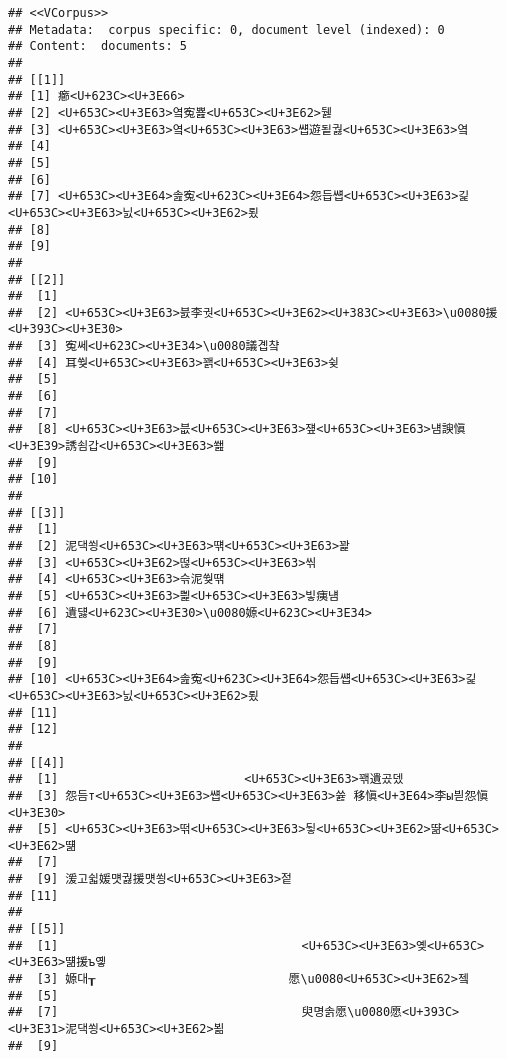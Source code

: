 \documentclass[]{article}
\begin{document}
\begin{verbatim}
## <<VCorpus>>
## Metadata:  corpus specific: 0, document level (indexed): 0
## Content:  documents: 5
## 
## [[1]]
## [1] 癤<U+623C><U+3E66>                  
## [2] <U+653C><U+3E63>옄寃뾾<U+653C><U+3E62>뒗
## [3] <U+653C><U+3E63>옄<U+653C><U+3E63>썝遊됱궗<U+653C><U+3E63>옄
## [4]                                     
## [5]                                     
## [6]                                     
## [7] <U+653C><U+3E64>솚寃<U+623C><U+3E64>怨듭썝<U+653C><U+3E63>긽<U+653C><U+3E63>닔<U+653C><U+3E62>룄
## [8]                                     
## [9]                                     
## 
## [[2]]
##  [1]                                     
##  [2] <U+653C><U+3E63>븘李궛<U+653C><U+3E62><U+383C><U+3E63>\u0080援<U+393C><U+3E30>
##  [3] 寃쎄<U+623C><U+3E34>\u0080議곕챸    
##  [4] 耳쒖<U+653C><U+3E63>꽭<U+653C><U+3E63>슂
##  [5]                                     
##  [6]                                     
##  [7]                                     
##  [8] <U+653C><U+3E63>븞<U+653C><U+3E63>쟾<U+653C><U+3E63>냼諛愼<U+3E39>誘쇰갑<U+653C><U+3E63>쐞
##  [9]                                     
## [10]                                     
## 
## [[3]]
##  [1]                                     
##  [2] 泥댁쑁<U+653C><U+3E63>떆<U+653C><U+3E63>꽕
##  [3] <U+653C><U+3E62>떦<U+653C><U+3E63>씪
##  [4] <U+653C><U+3E63>슦泥쒖떆            
##  [5] <U+653C><U+3E63>삁<U+653C><U+3E63>빟痍냼
##  [6] 遺덇<U+623C><U+3E30>\u0080嫄<U+623C><U+3E34>
##  [7]                                     
##  [8]                                     
##  [9]                                     
## [10] <U+653C><U+3E64>솚寃<U+623C><U+3E64>怨듭썝<U+653C><U+3E63>긽<U+653C><U+3E63>닔<U+653C><U+3E62>룄
## [11]                                     
## [12]                                     
## 
## [[4]]
##  [1]                          <U+653C><U+3E63>꽦遺곴뎄
##  [3] 怨듬т<U+653C><U+3E63>썝<U+653C><U+3E63>쓣 移愼<U+3E64>李ы븯怨愼<U+3E30>
##  [5] <U+653C><U+3E63>떢<U+653C><U+3E63>뒿<U+653C><U+3E62>땲<U+653C><U+3E62>떎                         
##  [7]                                                  
##  [9] 湲고쉷媛먯궗援먯쑁<U+653C><U+3E63>젙                         
## [11]                         
## 
## [[5]]
##  [1]                                  <U+653C><U+3E63>옞<U+653C><U+3E63>떎援ъ옣
##  [3] 嫄대┰                           愿\u0080<U+653C><U+3E62>젴      
##  [5]                                                                  
##  [7]                                  臾명솕愿\u0080愿<U+393C><U+3E31>泥댁쑁<U+653C><U+3E62>뵒
##  [9]
\end{verbatim}
\end{document}

